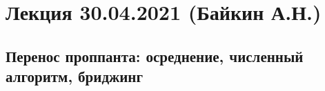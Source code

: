 \documentclass[main.tex]{subfiles}
\begin{document}

\section{Лекция 30.04.2021 (Байкин А.Н.)}

\subsection{Перенос проппанта: осреднение, численный алгоритм, бриджинг}
\end{document}
